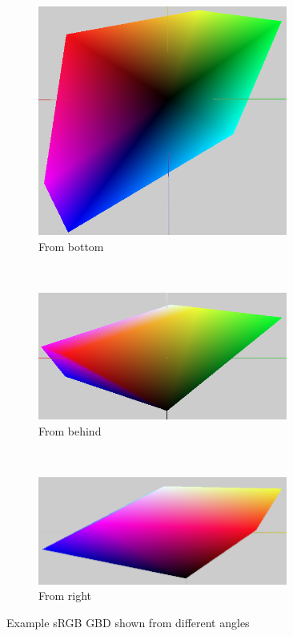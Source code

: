 \begin{figure}[H]
	\begin{subfigure}[t]{0.3\textwidth}
		\centering
		\includegraphics[width=0.9\textwidth]{img/solid-bottom}
		\caption{From bottom}
	\end{subfigure}%
	~
	\begin{subfigure}[t]{0.3\textwidth}
		\centering
		\includegraphics[width=0.9\textwidth]{img/solid-back}
		\caption{From behind}
	\end{subfigure}%
	~
	\begin{subfigure}[t]{0.3\textwidth}
		\centering
		\includegraphics[width=0.9\textwidth]{img/solid-right}
		\caption{From right}
	\end{subfigure}
	\caption{Example sRGB GBD shown from different angles}
	\label{fig:sides}
\end{figure}

